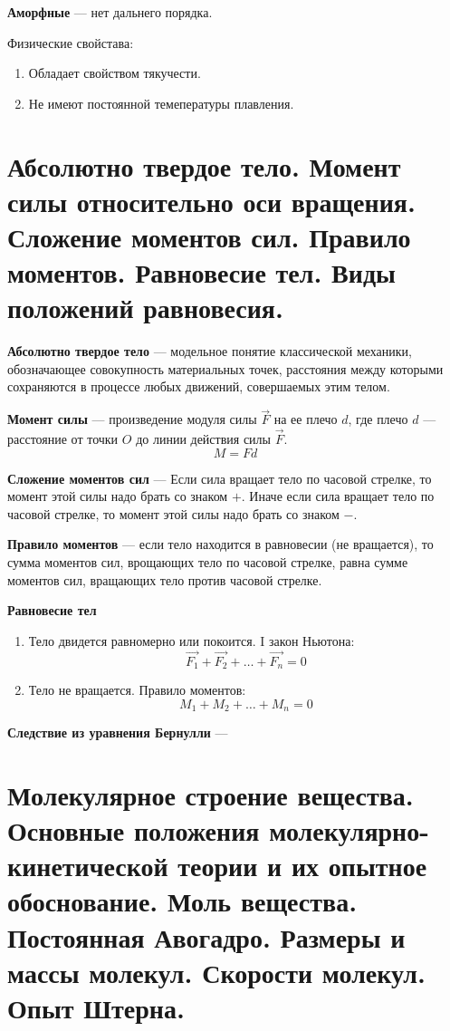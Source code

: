 \documentclass{report}
\begin{document}
{\bf Аморфные} ---
нет дальнего порядка.

Физические свойстава:
\begin{enumerate}
  \item Обладает свойством тякучести.
  \item Не имеют постоянной темепературы плавления.
\end{enumerate}



\part{Абсолютно твердое тело. 
Момент силы относительно оси вращения. 
Сложение моментов сил. 
Правило моментов. 
Равновесие тел. 
Виды положений равновесия.}

{\bf Абсолютно твердое тело} ---
модельное понятие классической механики, обозначающее совокупность материальных 
точек, расстояния между которыми сохраняются в процессе любых движений, совершаемых этим телом.

{\bf Момент силы} ---
произведение модуля силы $\vec{F}$ на ее плечо $d$, где плечо $d$ — 
расстояние от точки $O$ до линии действия силы $\vec{F}$. 
$$
M=Fd
$$

{\bf Сложение моментов сил} ---
Если сила вращает тело по часовой стрелке, то момент этой силы надо брать со знаком $+$.
Иначе если сила вращает тело по часовой стрелке, то момент этой силы надо брать со знаком $-$.

{\bf Правило моментов} ---
если тело находится в равновесии (не вращается), то сумма моментов сил, врощающих тело по часовой
стрелке, равна сумме моментов сил, вращающих тело против часовой стрелке.

{\bf Равновесие тел}
\begin{enumerate}
  \item Тело двидется равномерно или покоится. I закон Ньютона:
  $$
  \vec{F_1}+\vec{F_2}+\dots+\vec{F_n}=0
  $$
  \item Тело не вращается. Правило моментов:
  $$
  M_1+M_2+\dots+M_n=0
  $$
\end{enumerate}

{\bf Следствие из уравнения Бернулли} ---



\part{Молекулярное строение вещества. 
Основные положения молекулярно-кинетической теории и их опытное обоснование. 
Моль вещества. 
Постоянная Авогадро.
Размеры и массы молекул. 
Скорости молекул. 
Опыт Штерна.  }
\end{document}
